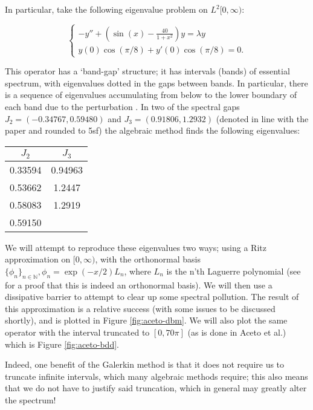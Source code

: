\documentclass[../main.tex]{subfiles}
\begin{document}
\begin{example}\label{ex:aceto} In particular, take the following eigenvalue
	problem on $L^2[0, \infty)$:

$$ \begin{cases} -y'' + (\sin(x) - \frac{40}{1+x^2})y = \lambda y \\ y(0)
\cos(\pi/8) + y'(0) \cos(\pi/8) = 0. \end{cases} $$

This operator has a `band-gap' structure; it has intervals (bands) of essential
spectrum, with eigenvalues dotted in the gaps between bands. In particular,
there is a sequence of eigenvalues accumulating from below to the lower boundary
of each band due to the perturbation \cite{schmidt2000critical}.
In two of the spectral gaps $J_2 = (-0.34767, 0.59480)$ and $J_3 = (0.91806,
1.2932)$ (denoted in line with the paper and rounded to 5sf) the
algebraic method finds the following eigenvalues:

\begin{figure*}[h!]
\centering \begin{tabular}{c c}
  $J_2$ & $J_3$ \\
  \hline\hline
  0.33594 & 0.94963 \\
  0.53662 & 1.2447 \\
  0.58083 & 1.2919 \\
  0.59150 & \\
\end{tabular}
\end{figure*}

We will attempt to reproduce these eigenvalues two ways; using a
Ritz approximation on $[0, \infty)$, with the orthonormal basis
$\{\phi_n\}_{n \in \mathbb{N}}, \phi_n = \exp(-x/2)L_n$, where $L_n$ is
the n'th Laguerre polynomial (see \cite{szego1975orthogonal} for a proof
that this is indeed an orthonormal basis). We will then use a dissipative
barrier to attempt to clear up some spectral pollution.
The result of this approximation is a relative success (with some issues
to be discussed shortly), 
and is plotted in Figure \ref{fig:aceto-dbm}.
We will also plot the same operator with the interval truncated to $[0, 70\pi]$
(as is done in Aceto et al.) which is Figure \ref{fig:aceto-bdd}.

Indeed, one benefit of the Galerkin method is that it does not require us to
truncate infinite intervals, which many algebraic methods require; this also
means that we do not have to justify said truncation, which in general may
greatly alter the spectrum!
\end{example}
\end{document}
